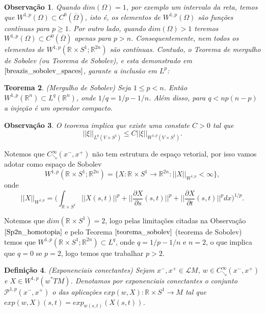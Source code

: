 \documentclass[12pt]{book}
\newtheorem{teorema}{Teorema}[section]
\newtheorem{definicao}[teorema]{Definição}
\newtheorem{observacao}[teorema]{Observação}
\newcommand{\aplicacaoexponencial}[2]{exp_{#1}(#2)}
\newcommand{\caminhosdecaimentoexponencial}[2]{C^{\infty}_{\searrow}(#1, #2)}
\newcommand{\caminhosdecaimentoexponencialpadrao}{\caminhosdecaimentoexponencial{x^{-}}{x^{+}}}
\newcommand{\caminhosexponenciaisconectantes}[2]{\mathcal{P}^{1,p}(#1, #2)}
\newcommand{\caminhosexponenciaisconectantespadrao}{\caminhosexponenciaisconectantes{x^{-}}{x^{+}}}
\newcommand{\circulo}{S^{1}}
\newcommand{\derivadaparcial}[2]{\frac{\partial #1}{\partial #2}}
\newcommand{\espacoLpGeral}[2]{L^{#1}(#2)}
\newcommand{\espacosobolev}[1]{W^{1,p}(#1)}
\newcommand{\espacosobolevcontradominio}[2]{W^{1,p}(#1;#2)}
\newcommand{\norma}[1]{||#1||}
\newcommand{\normagrande}[1]{\Big|\Big|#1\Big|\Big|}
\newcommand{\normaLgGeral}[3]{\norma{#1}_{\espacoLpGeral{#2}{#3}}}
\newcommand{\normaWp}[1]{||#1||_{W^{1,p}}}
\newcommand{\normaWpGeralDominio}[3]{\norma{#1}_{W^{1,#2}(#3)}}
\newcommand{\pullbackfibradotangente}[2]{#1^{*}T#2}
\newcommand{\pullbackfibradotangenteM}[1]{\pullbackfibradotangente{#1}{M}}
\newcommand{\retacartesianocirculo}{\real{} \times \circulo}
\newcommand{\real}[1]{\mathbb{R}^{#1}}
\newcommand{\solucoesperiodicascontrateis}{\mathcal{L}M}
\begin{document}
	\begin{observacao}\label{observacao}
		Quando $dim(\Omega) = 1$, por exemplo um intervalo da reta, temos que $\espacosobolev{\Omega} \subset C^{0}(\overline{\Omega})$, isto é, os elementos de $\espacosobolev{\Omega}$ são funções contínuas para $p \geq 1$. Por outro lado, quando $dim(\Omega)>1$ teremos $\espacosobolev{\Omega} \subset C^{0}(\overline{\Omega})$ apenas para $p>n$. Consequentemente, nem todos os elementos de  $\espacosobolevcontradominio{\retacartesianocirculo}{\real{2n}}$  são contínuas. Contudo, o Teorema de mergulho de Sobolev (ou Teorema de Sobolev), e esta demonstrado em $\cite{breazis_sobolev_spaces}$, garante a inclusão em $L^{p}$:
	\end{observacao}
	
	\begin{teorema}\label{teorema_sobolev}
		(Mergulho de Sobolev) Seja $1 \leq p < n$. Então $\espacosobolev{\real{n}} \subset L^{q}(\real{n})$, onde $1/q = 1/p -1/n$. Além disso, para $q<np(n-p)$ a injeção é um operador compacto.
	\end{teorema}
	
	\begin{observacao}
		O teorema implica que existe uma constate $C>0$ tal que 
		$$
		\normaLgGeral{\xi}{q}{V \times \circulo} \leq C \normaWpGeralDominio{\xi}{p}{V \times \circulo}.
		$$
	\end{observacao}
	
	Notemos que $\caminhosdecaimentoexponencialpadrao$ não tem estrutura de espaço vetorial, por isso vamos adotar como espaço de Sobolev 
	$$
	\espacosobolevcontradominio{\retacartesianocirculo}{\real{2n}}=\{X:\retacartesianocirculo \to \real{2n} : \normaWp{X}<\infty\},
	$$
	onde 
	$$
	\normaWp{X} = \Big(\int_{\retacartesianocirculo} \norma{X(s,t)}^{p}+\normagrande{\derivadaparcial{X}{s}(s,t)}^{p}+\normagrande{\derivadaparcial{X}{t}(s,t)}^{p}dx \Big)^{1/p}.
	$$
	
	Notemos que $dim(\retacartesianocirculo) = 2$, logo pelas limitações citadas na Observação $\ref{Sp2n_homotopia}$ e pelo Teorema $\ref{teorema_sobolev}$ (teorema de Sobolev) temos que $\espacosobolevcontradominio{\retacartesianocirculo}{\real{2n}} \subset L^{q}$, onde $q = 1/p - 1/n$ e $n = 2$, o que implica que $q = 0$ se $p=2$, logo temos que trabalhar $p>2$.
	
	\begin{definicao}
		(Exponenciais conectantes) Sejam $x^{-}, x^{+} \in \solucoesperiodicascontrateis$, $w \in \caminhosdecaimentoexponencialpadrao$ e $X \in \espacosobolev{\pullbackfibradotangenteM{w}}$. Denotamos por exponenciais conectantes  o conjunto $\caminhosexponenciaisconectantespadrao$ o das aplicações $exp(w,X):\retacartesianocirculo \to M$ tal que $exp(w,X)(s,t) = \aplicacaoexponencial{w(s,t)}{X(s,t)}$.
	\end{definicao}
	
\end{document}

